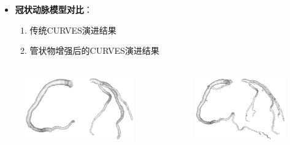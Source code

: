 \begin{frame}
\begin{itemize}
  \item \textbf{冠状动脉模型对比}：
  \begin{enumerate}
     \item 传统CURVES演进结果
     \item 管状物增强后的CURVES演进结果
  \end{enumerate}
\end{itemize}
\begin{columns}[b,onlytextwidth]
\begin{column}{.5\textwidth}
 \begin{figure}[t]
\centering
\includegraphics[height=1.2in]{../../Figures/coronary/coronary_enhanced/model_conventional.eps}
\end{figure}
\end{column}
\begin{column}{.5\textwidth}
 \begin{figure}[t]
\centering
\includegraphics[height=1.2in]{../../Figures/coronary/coronary_enhanced/model_enhanced.eps}
\end{figure}
\end{column}
\end{columns}
\end{frame}




